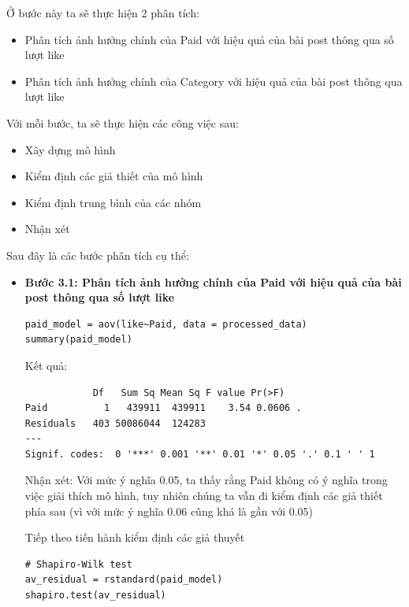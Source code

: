 \begin{itemize}
\begin{itemize}
    Ở bước này ta sẽ thực hiện 2 phân tích:
    \begin{itemize}
        \item Phân tích ảnh hưởng chính của Paid với hiệu quả của bài post thông qua số lượt like
        \item Phân tích ảnh hưởng chính của Category với hiệu quả của bài post thông qua lượt like
    \end{itemize}
    Với mỗi bước, ta sẽ thực hiện các công việc sau:
    \begin{itemize}
        \item Xây dựng mô hình
        \item Kiểm định các giả thiết của mô hình
        \item Kiểm định trung bình của các nhóm
        \item Nhận xét
    \end{itemize}
    Sau đây là các bước phân tích cụ thể:
    \begin{itemize}
        \item \textbf{Bước 3.1: Phân tích ảnh hưởng chính của Paid với hiệu quả của bài post thông qua số lượt like}
        \begin{lstlisting}
paid_model = aov(like~Paid, data = processed_data)
summary(paid_model)
        \end{lstlisting}
        Kết quả:
        \begin{lstlisting}
            Df   Sum Sq Mean Sq F value Pr(>F)  
Paid          1   439911  439911    3.54 0.0606 .
Residuals   403 50086044  124283                 
---
Signif. codes:  0 '***' 0.001 '**' 0.01 '*' 0.05 '.' 0.1 ' ' 1
        \end{lstlisting}
        Nhận xét: Với mức ý nghĩa 0.05, ta thấy rằng Paid không có ý nghĩa trong việc giải thích mô hình, tuy nhiên chúng ta vẫn đi kiểm định các giả thiết phía sau (vì với mức ý nghĩa 0.06 cũng khá là gần với 0.05)

        Tiếp theo tiến hành kiểm định các giả thuyết
        \begin{lstlisting}
# Shapiro-Wilk test
av_residual = rstandard(paid_model)
shapiro.test(av_residual)


\end{lstlisting}
\end{itemize}
\end{itemize}
\end{itemize}
